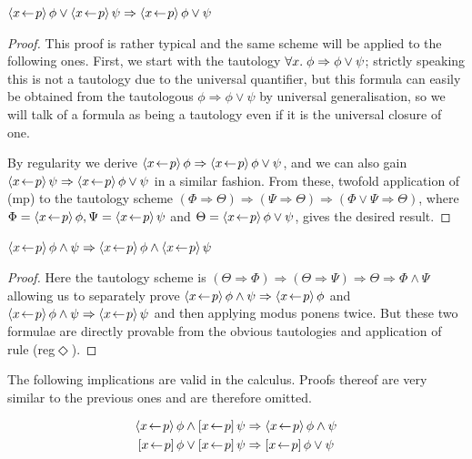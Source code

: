 \begin{lem}
  $\langle x\!\gets\! p\rangle\,{\phi} \lor \langle x\!\gets\! p\rangle\,{\psi} \Rightarrow \langle x\!\gets\! p\rangle\,{\phi \lor \psi}$
\end{lem}
\begin{proof}
  This proof is rather typical and the same scheme will be applied to the
  following ones. First, we start with the tautology $\forall x.\; \phi \Rightarrow \phi \lor \psi$;
  strictly speaking this is not a tautology due to the universal quantifier, but
  this formula can easily be obtained from the tautologous $\phi \Rightarrow \phi \lor \psi$ by
  universal generalisation, so we will talk of a formula as being a tautology
  even if it is the universal closure of one.

  By regularity we derive $\langle x\!\gets\! p\rangle\,{\phi} \Rightarrow \langle x\!\gets\! p\rangle\,{\phi \lor \psi}$, and we can also gain
  $\langle x\!\gets\! p\rangle\,{\psi} \Rightarrow \langle x\!\gets\! p\rangle\,{\phi \lor \psi}$ in a similar fashion. From these, twofold
  application of (mp) to the tautology scheme $(\Phi \Rightarrow \Theta) \Rightarrow (\Psi \Rightarrow \Theta) \Rightarrow (\Phi \lor \Psi \Rightarrow \Theta)$,
  where $\Phi = \langle x\!\gets\! p\rangle\,{\phi}, \Psi = \langle x\!\gets\! p\rangle\,{\psi}$ and $\Theta = \langle x\!\gets\! p\rangle\,{\phi \lor \psi}$, gives the
  desired result.
\end{proof}

\begin{lem}
  $\langle x\!\gets\! p\rangle\,{\phi \land \psi} \Rightarrow \langle x\!\gets\! p\rangle\,{\phi} \land \langle x\!\gets\! p\rangle\,{\psi}$
\end{lem}
\begin{proof}
  Here the tautology scheme is $(\Theta \Rightarrow \Phi) \Rightarrow (\Theta \Rightarrow \Psi) \Rightarrow \Theta  \Rightarrow \Phi  \land \Psi $ allowing us to
  separately prove $\langle x\!\gets\! p\rangle\,{\phi\land\psi} \Rightarrow \langle x\!\gets\! p\rangle\,{\phi}$ and $\langle x\!\gets\! p\rangle\,{\phi\land\psi} \Rightarrow \langle x\!\gets\! p\rangle\,{\psi}$ and
  then applying modus ponens twice. But these two formulae are directly provable
  from the obvious tautologies and application of rule (reg$\Diamond$).
\end{proof}

\begin{lem}
  \label{thm:more-distrib}
  The following implications are valid in the calculus. Proofs thereof are very
  similar to the previous ones and are therefore omitted.

  \begin{gather*}
      \xpdmd{\phi} \land \xpbox{\psi} \Rightarrow \xpdmd{\phi \land \psi} \\
      \xpbox{\phi} \lor \xpbox{\psi} \Rightarrow \xpbox{\phi \lor \psi}
  \end{gather*}
\end{lem}

